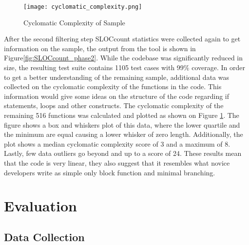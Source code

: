 \begin{figure}[!htb]
	\begin{center}
		\texttt{[image: cyclomatic\_complexity.png]}
		\caption{\label{fig:cyclomatic_complexity_of_sample} Cyclomatic
		Complexity of Sample}
	\end{center}
\end{figure}

After the second filtering step SLOCcount statistics were collected again to get
information on the sample, the output from the tool is shown in
Figure\ref{fig:SLOCcount_phase2}. While the codebase was significantly reduced in
size, the resulting test suite contains 1105 test cases with 99\% coverage.
In order to get a better understanding of the remaining sample, additional data
was collected on the cyclomatic complexity of the functions in the code. This
information would give some ideas on the structure of the code regarding if
statements, loops and other constructs. The cyclomatic complexity of the
remaining 516 functions was calculated and plotted as shown on Figure
\ref{fig:cyclomatic_complexity_of_sample}. The figure shows a box and whiskers
plot of this data, where the lower quartile and the minimum are equal causing a
lower whisker of zero length. Additionally, the plot shows a median cyclomatic
complexity score of 3 and a maximum of 8. Lastly, few data outliers go beyond
and up to a score of 24. These results mean that the code is very linear, they also suggest that it resembles
what novice developers write as simple only block function and minimal branching.

\section{Evaluation}
\label{sec:evaluation}

\subsection{Data Collection}
\label{subsec:data_collection}

